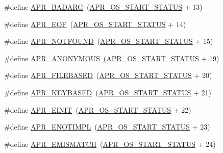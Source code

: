 \begin{DoxyCompactItemize}
\item 
\#define \hyperlink{group__APR__Error_ga771bf48ab38d93355be8530f6efe4ae9}{A\+P\+R\+\_\+\+B\+A\+D\+A\+RG}~(\hyperlink{group__apr__errno_ga450e1a5734732e092ddaa5b67414f69b}{A\+P\+R\+\_\+\+O\+S\+\_\+\+S\+T\+A\+R\+T\+\_\+\+S\+T\+A\+T\+US} + 13)
\item 
\#define \hyperlink{group__APR__Error_ga35d9dca2514c522a2840aca0f3e2ebd3}{A\+P\+R\+\_\+\+E\+OF}~(\hyperlink{group__apr__errno_ga450e1a5734732e092ddaa5b67414f69b}{A\+P\+R\+\_\+\+O\+S\+\_\+\+S\+T\+A\+R\+T\+\_\+\+S\+T\+A\+T\+US} + 14)
\item 
\#define \hyperlink{group__APR__Error_ga9bd83273ff02f31f71fb4dc6f29df4a9}{A\+P\+R\+\_\+\+N\+O\+T\+F\+O\+U\+ND}~(\hyperlink{group__apr__errno_ga450e1a5734732e092ddaa5b67414f69b}{A\+P\+R\+\_\+\+O\+S\+\_\+\+S\+T\+A\+R\+T\+\_\+\+S\+T\+A\+T\+US} + 15)
\item 
\#define \hyperlink{group__APR__Error_ga738a229b0c27bd96ae0173fecab251b7}{A\+P\+R\+\_\+\+A\+N\+O\+N\+Y\+M\+O\+US}~(\hyperlink{group__apr__errno_ga450e1a5734732e092ddaa5b67414f69b}{A\+P\+R\+\_\+\+O\+S\+\_\+\+S\+T\+A\+R\+T\+\_\+\+S\+T\+A\+T\+US} + 19)
\item 
\#define \hyperlink{group__APR__Error_ga28a6d59b62d2698208451a9343399fbb}{A\+P\+R\+\_\+\+F\+I\+L\+E\+B\+A\+S\+ED}~(\hyperlink{group__apr__errno_ga450e1a5734732e092ddaa5b67414f69b}{A\+P\+R\+\_\+\+O\+S\+\_\+\+S\+T\+A\+R\+T\+\_\+\+S\+T\+A\+T\+US} + 20)
\item 
\#define \hyperlink{group__APR__Error_gaac52bebace264494fa94cdf0b4344d26}{A\+P\+R\+\_\+\+K\+E\+Y\+B\+A\+S\+ED}~(\hyperlink{group__apr__errno_ga450e1a5734732e092ddaa5b67414f69b}{A\+P\+R\+\_\+\+O\+S\+\_\+\+S\+T\+A\+R\+T\+\_\+\+S\+T\+A\+T\+US} + 21)
\item 
\#define \hyperlink{group__APR__Error_gaacd087793c97a3493eafc14075775b82}{A\+P\+R\+\_\+\+E\+I\+N\+IT}~(\hyperlink{group__apr__errno_ga450e1a5734732e092ddaa5b67414f69b}{A\+P\+R\+\_\+\+O\+S\+\_\+\+S\+T\+A\+R\+T\+\_\+\+S\+T\+A\+T\+US} + 22)
\item 
\#define \hyperlink{group__APR__Error_ga939ddb834a30bc9a5a0a329b13000161}{A\+P\+R\+\_\+\+E\+N\+O\+T\+I\+M\+PL}~(\hyperlink{group__apr__errno_ga450e1a5734732e092ddaa5b67414f69b}{A\+P\+R\+\_\+\+O\+S\+\_\+\+S\+T\+A\+R\+T\+\_\+\+S\+T\+A\+T\+US} + 23)
\item 
\#define \hyperlink{group__APR__Error_ga31e65a44daba96aa6d943529e94498e7}{A\+P\+R\+\_\+\+E\+M\+I\+S\+M\+A\+T\+CH}~(\hyperlink{group__apr__errno_ga450e1a5734732e092ddaa5b67414f69b}{A\+P\+R\+\_\+\+O\+S\+\_\+\+S\+T\+A\+R\+T\+\_\+\+S\+T\+A\+T\+US} + 24)

\end{DoxyCompactItemize}
